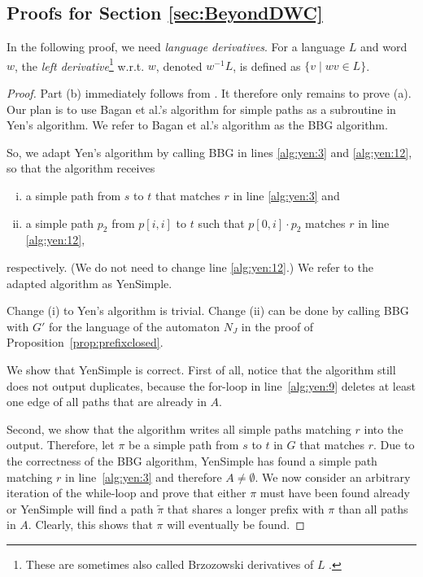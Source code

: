 \documentclass[a4paper,english]{lipics-v2016}
\theoremstyle{plain}
\begin{document}
\subsection{Proofs for Section \ref{sec:BeyondDWC}}  \label{app:yen}

In the following proof, we need \emph{language derivatives}.  For a
language $L$ and word $w$, the \emph{left derivative}\footnote{These
  are sometimes also called Brzozowski derivatives of $L$
  \cite{BrzozowskiJ-JACM64}.}  \mbox{w.r.t.} $w$, denoted $w^{-1} L$,
is defined as $\{v \mid wv \in L\}$. 

\BaganPolyDelay*
\begin{proof}
  Part (b) immediately follows from \cite[Theorem 1]{bagan}. It
  therefore only remains to prove (a). Our plan is to use Bagan et
  al.'s algorithm for simple paths as a subroutine in Yen's
  algorithm. We refer to Bagan et al.'s algorithm as the BBG
  algorithm.

  So, we adapt Yen's algorithm by calling BBG in lines
  \ref{alg:yen:3} and \ref{alg:yen:12}, so that the algorithm
  receives
  \begin{enumerate}[(i)]
  \item a simple path from $s$ to $t$ that matches $r$ in line
    \ref{alg:yen:3} and
  \item a simple path $p_2$ from $p[i,i]$ to $t$ such that
    $p[0,i]\cdot p_2$ matches $r$ in line \ref{alg:yen:12},
  \end{enumerate}
  respectively. (We do not need to change line \ref{alg:yen:12}.)
  We refer to the adapted algorithm as YenSimple.

  Change (i) to Yen's algorithm is trivial. Change (ii) can be done by
  calling BBG with $G'$ for the language of the automaton $N_J$ in the
  proof of Proposition~\ref{prop:prefixclosed}.

  \fbox{$\cdots$}
  We show that YenSimple is correct. First of all, notice
  that the algorithm still does not output duplicates, because the for-loop
  in line~\ref{alg:yen:9} deletes at least one edge of all paths that
  are already in $A$.
	
  Second, we show that the algorithm writes all simple paths matching
  $r$ into the output.  Therefore, 
      let $\pi$ be a simple path from $s$ to $t$ in $G$ that
  matches $r$.
    Due to the correctness of
  the BBG algorithm, YenSimple has found a simple path matching $r$ in
  line~\ref{alg:yen:3} and therefore $A\neq \emptyset$. 
  We now consider an arbitrary iteration of the while-loop and prove
  that either $\pi$ must have been found already or YenSimple will find
  a path $\tilde{\pi}$ that shares a longer prefix with $\pi$ than all
  paths in $A$. Clearly, this shows that $\pi$ will eventually be found.
  

\end{proof}
\end{document}
